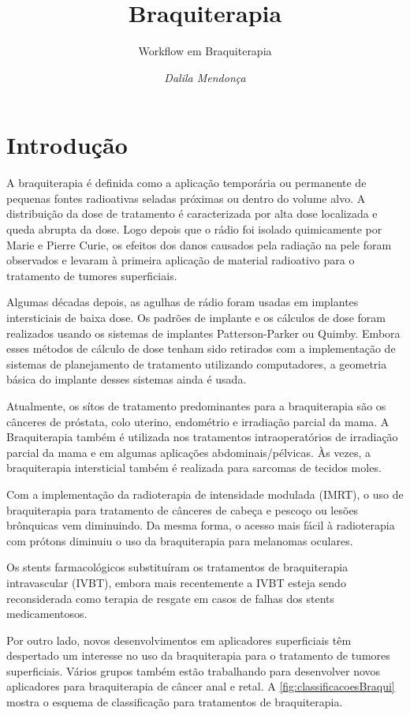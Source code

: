 \documentclass[11pt,a4paper]{article}
\title{\LobsterTwo\Huge{Braquiterapia}}
\author{\LobsterTwo\Large{Workflow em Braquiterapia}\nocite{*}}
\date{\LobsterTwo\textit{Dalila Mendonça}}
\begin{document}
	\maketitle

\section{Introdução}

	A braquiterapia é definida como a aplicação temporária ou permanente de pequenas fontes radioativas seladas próximas ou dentro do volume alvo. A distribuição da dose de tratamento é caracterizada por alta dose localizada e queda abrupta da dose. Logo depois que o rádio foi isolado quimicamente por Marie e Pierre Curie, os efeitos dos danos causados pela radiação na pele foram observados e levaram à primeira aplicação de material radioativo para o tratamento de tumores superficiais. 

	Algumas décadas depois, as agulhas de rádio foram usadas em implantes intersticiais de baixa dose. Os padrões de implante e os cálculos de dose foram realizados usando os sistemas de implantes Patterson-Parker ou Quimby. Embora esses métodos de cálculo de dose tenham sido retirados com a implementação de sistemas de planejamento de tratamento utilizando computadores, a geometria básica do implante desses sistemas ainda é usada.

	Atualmente, os sítos de tratamento predominantes para a braquiterapia são os cânceres de próstata, colo uterino, endométrio e irradiação parcial da mama. A Braquiterapia também é utilizada nos tratamentos intraoperatórios de irradiação parcial da mama e em algumas aplicações abdominais/pélvicas. Às vezes, a braquiterapia intersticial também é realizada para sarcomas de tecidos moles. 
	
	Com a implementação da radioterapia de intensidade modulada (IMRT), o uso de braquiterapia para tratamento de cânceres de cabeça e pescoço ou lesões brônquicas vem diminuindo. Da mesma forma, o acesso mais fácil à radioterapia com prótons diminuiu o uso da braquiterapia para melanomas oculares. 
	
	Os stents farmacológicos substituíram os tratamentos de braquiterapia intravascular (IVBT), embora mais recentemente a IVBT esteja sendo reconsiderada como terapia de resgate em casos de falhas dos stents medicamentosos. 
	
	Por outro lado, novos desenvolvimentos em aplicadores superficiais têm despertado um interesse no uso da braquiterapia para o tratamento de tumores superficiais. Vários grupos também estão trabalhando para desenvolver novos aplicadores para braquiterapia de câncer anal e retal. A \ref{fig:classificacoesBraqui} mostra o esquema de classificação para tratamentos de braquiterapia.
\end{document}
